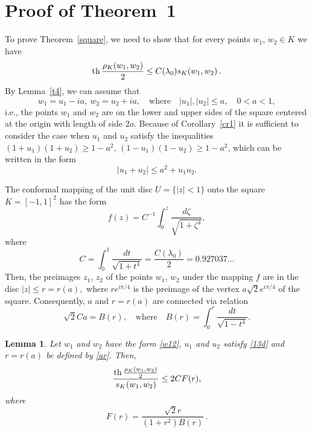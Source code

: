 \documentclass[12pt,a4paper]{amsart}
\newtheorem{lemma}{Lemma}
\def\th{\mathop{\rm th}\nolimits}
\begin{document}
\section{Proof of Theorem~1}

To prove Theorem~\ref{square}, we need to show that for every points $w_1$, $w_2\in K$ we have
\begin{equation}\label{srho}
{\th\frac{\rho_K(w_1,w_2)}{2}}  \le C(\lambda_0){s_K(w_1,w_2)}\,.
\end{equation}
By Lemma~\ref{t4}, we can assume that
\begin{equation}\label{w12}
w_1=u_1-ia, \ w_2=u_2+ia, \quad \text{where} \quad  |u_1|, |u_2|\le a,
\quad 0<a<1,
\end{equation}
i.e., the points $w_1$ and $w_2$ are on the lower and upper sides of the square centered at the origin with length of side $2a$.
Because of Corollary~\ref{cr1} it is sufficient to consider the case when $u_1$ and $u_2$ satisfy the inequalities
$(1+u_1)(1+u_2)\ge 1-a^2$, $(1-u_1)(1-u_2)\ge 1-a^2$, which can be written in the form
\begin{equation}\label{13d}
|u_1+u_2|\le a^2+u_1u_2.
\end{equation}

The conformal mapping of the unit disc $U=\{|z|<1\}$ onto the square
$K=[-1,1]^2$ has the form
\begin{equation}\label{10d}
f(z)=C^{-1}\int_0^z \frac{d\zeta}{\sqrt{1+\zeta^4}},
\end{equation}
where
$$
C=\int_0^1 \frac{dt}{\sqrt{1+t^4}}=\frac{C(\lambda_0)}{2}=0.927037...
$$
Then, the preimages $z_1$, $z_2$  of the points $w_1$, $w_2$ under the mapping $f$ are in the disc $|z|\le r=r(a),$ where $re^{i\pi/4}$ is the preimage of the vertex $a\sqrt{2}e^{i\pi/4}$ of the square. Consequently, $a$ and $r=r(a)$ are connected via relation
\begin{equation}\label{ar}
\sqrt{2} Ca=B(r), \quad \text{where}\quad B(r)=\int_0^{r} \frac{dt}{\sqrt{1-t^4}}.
\end{equation}

\begin{lemma} \label{t6}
Let $w_1$ and $w_2$ have the form \eqref{w12}, $u_1$ and $u_2$
satisfy \eqref{13d} and $r=r(a)$ be defined by \eqref{ar}. Then,
\begin{equation}\label{frac}
\frac{\th\frac{\rho_K(w_1,w_2)}{2}}{s_K(w_1,w_2)}\le 2C F(r),
\end{equation}
where
$$
F(r)=\frac{\sqrt{2}r}{(1+r^2)B(r)}\,.
$$
\end{lemma}
\end{document}
